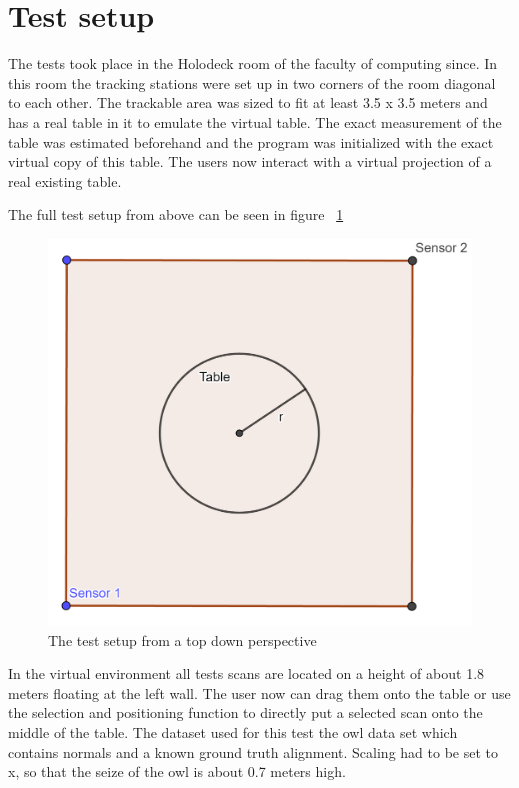 \documentclass[hyperref,english,bachelorofscience,bibnum,twoside]{cgvpub}
\begin{document}
\section{Test setup}

The tests took place in the Holodeck room of the faculty of computing since. In this room the tracking stations were set up in two corners of the room diagonal to each other. The trackable area was sized to fit at least 3.5 x 3.5 meters and has a real table in it to emulate the virtual table. The exact measurement of the table was estimated beforehand and the program was initialized with the exact virtual copy of this table. The users now interact with a virtual projection of a real existing table.

The full test setup from above can be seen in figure ~\ref{fig:test}

\begin{figure}[htbp]
	\centering
		\includegraphics[width= \linewidth]{test_setup.png}
	\caption{The test setup from a top down perspective}
	\label{fig:test}
\end{figure}

In the virtual environment all tests scans are located on a height of about 1.8 meters floating at the left wall. The user now can drag them onto the table or use the selection and positioning function to directly put a selected scan onto the middle of the table.
The dataset used for this test the owl data set which contains normals and a known ground truth alignment. Scaling had to be set to x, so that the seize of the owl is about 0.7 meters high.
\end{document}
